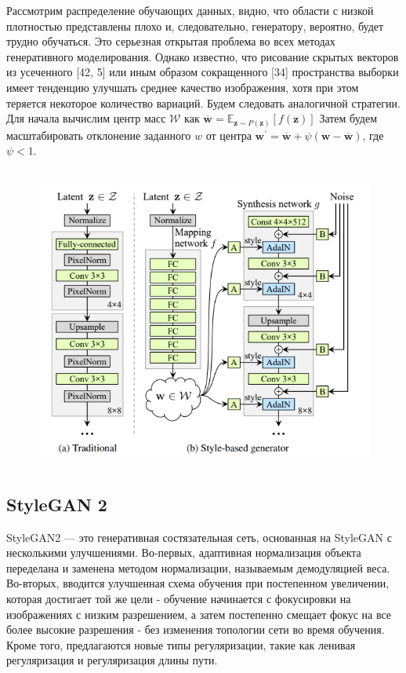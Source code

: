 Рассмотрим распределение обучающих данных, видно, что области с низкой плотностью представлены плохо и, следовательно, генератору, вероятно, будет трудно обучаться. Это серьезная открытая проблема во всех методах генеративного моделирования. Однако известно, что рисование скрытых векторов из усеченного [42, 5] или иным образом сокращенного [34] пространства выборки имеет тенденцию улучшать среднее качество изображения, хотя при этом теряется некоторое количество вариаций.
Будем следовать аналогичной стратегии. Для начала вычислим центр масс $\mathcal{W}$ как $\overline{\mathbf{w}}=\mathbb{E}_{\mathbf{z} \sim P(\mathbf{z})}[f(\mathbf{z})]$
Затем будем масштабировать отклонение заданного $w$ от центра $\mathbf{w}^{\prime}=\overline{\mathbf{w}}+\psi(\mathbf{w}-\overline{\mathbf{w}})$, где $\psi < 1$.
\begin{figure}
    \centering
    \includegraphics[height=100mm]{fig/stylegan_scheme.png}
    \caption{}
    \label{fig.stylegan_scheme}
\end{figure}


\subsection{StyleGAN 2}
StyleGAN2 --- это генеративная состязательная сеть, основанная на StyleGAN с несколькими улучшениями. Во-первых, адаптивная нормализация объекта переделана и заменена методом нормализации, называемым демодуляцией веса. Во-вторых, вводится улучшенная схема обучения при постепенном увеличении, которая достигает той же цели - обучение начинается с фокусировки на изображениях с низким разрешением, а затем постепенно смещает фокус на все более высокие разрешения - без изменения топологии сети во время обучения. Кроме того, предлагаются новые типы регуляризации, такие как ленивая регуляризация и регуляризация длины пути.

